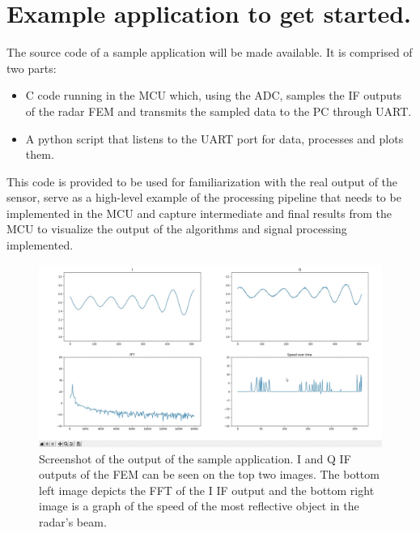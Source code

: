 \documentclass[12pt]{article}
\begin{document}
\section*{Example application to get started.}

The source code of a sample application will be made available. It is comprised of two parts:

\begin{itemize}

\item C code running in the MCU which, using the ADC, samples the IF outputs of the radar FEM and transmits the sampled data to the PC through UART.

\item A python script that listens to the UART port for data, processes and plots them. 

 
\end{itemize}

\noindent This code is provided to be used for familiarization with the real output of the sensor, serve as a high-level example of the processing pipeline that needs to be implemented in the MCU and capture intermediate and final results from the MCU to visualize the output of the algorithms and signal processing implemented.


\begin{figure}[H]
\centering
\includegraphics[width=0.9\linewidth,keepaspectratio]{pics/sample_application_output.jpg}
\caption{ Screenshot of the output of the sample application. I and Q IF outputs of the FEM can be seen on the top two images. The bottom left image depicts the FFT of the I IF output and the bottom right image is a graph of the speed of the most reflective object in the radar's beam.  \label{image:smaple_app_out}}
\end{figure}
 
\clearpage
\setcounter{section}{1}
\end{document}
